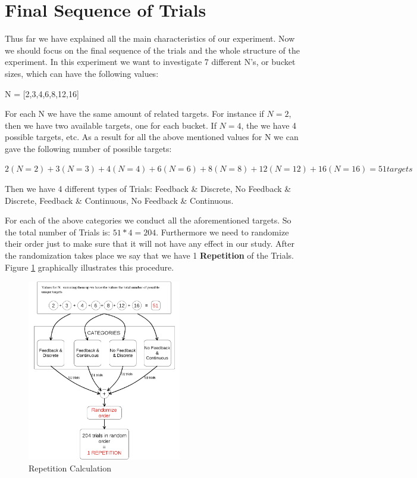 \section{Final Sequence of Trials}
\label{sec:FinalSequenceofTrials}


Thus far we have explained all the main characteristics of our experiment. Now we should focus on the final sequence of the trials and the whole structure of the experiment. In this experiment we want to investigate 7 different N's, or bucket sizes, which can have the following values:

N = [2,3,4,6,8,12,16]

For each N we have the same amount of related targets. For instance if $N=2$, then we have two available targets, one for each bucket. If $N=4$, the we have 4 possible targets, etc.
As a result for all the above mentioned values for N we can gave the following number of possible targets:

$2(N=2)+3(N=3)+4(N=4)+6(N=6)+8(N=8)+12(N=12)+16(N=16) = 51 targets$

Then we have 4 different types of Trials: Feedback \& Discrete, No Feedback \& Discrete, Feedback \& Continuous, No Feedback \& Continuous.

For each of the above categories we conduct all the aforementioned targets. So the total number of Trials is:
$51*4 = 204$. Furthermore we need to randomize their order just to make sure that it will not have any effect in our study. After the randomization takes place we say that we have 1 \textbf{Repetition} of the Trials. Figure \ref{fig:ffRepetition} graphically illustrates this procedure.


\begin{figure}[h]
\centering
\includegraphics[width=0.6\textwidth]{figures/repetition.png}
\caption{Repetition Calculation}
\label{fig:ffRepetition}
\end{figure}


